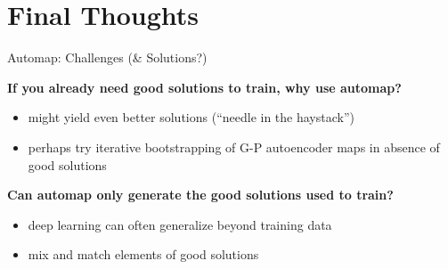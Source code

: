 \section{Final Thoughts}

\begin{frame}{Automap: Challenges (\& Solutions?)}

\textbf{If you already need good solutions to train, why use automap?}
\pause
\vspace{-1ex}
\begin{itemize}[<+->]
\itemsep0em
\item might yield even better solutions (``needle in the haystack'')
\item perhaps try iterative bootstrapping of G-P autoencoder maps in absence of good solutions
\end{itemize}
\vspace{-1ex}
\pause
\textbf{Can automap only generate the good solutions used to train?}
\pause
\vspace{-1ex}
\begin{itemize}[<+->]
\itemsep0em
\item deep learning can often generalize beyond training data
\item mix and match elements of good solutions
\end{itemize}

\end{frame}
